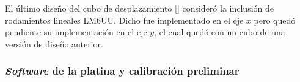 \begin{figure}[H]
\begin{floatrow}
	\end{floatrow}
\end{figure}

El último diseño del cubo de desplazamiento [\href{https://github.com/jrr1984/open_frame_XYStage/blob/master/3dprintedparts/STLs/cuboconLM6UU_2demarzo.STL}{\faCubes}] consideró la inclusión de rodamientos lineales LM6UU. Dicho fue implementado en el eje $\textit{x}$ pero quedó pendiente su implementación en el eje $\textit{y}$, el cual quedó con un cubo de una versión de diseño anterior.


\singlespacing
\subsubsection{\textit{Software} de la platina \href{https://github.com/jrr1984/open\_frame\_XYStage}{\faGithub}  y calibración preliminar}
\label{sec:softcalib}


